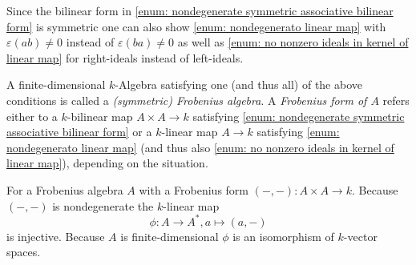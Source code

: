 \begin{rem}
  Since the bilinear form in \ref{enum: nondegenerate symmetric associative bilinear form} is symmetric one can also show \ref{enum: nondegenerato linear map} with $\varepsilon(ab) \neq 0$ instead of $\varepsilon(ba) \neq 0$ as well as \ref{enum: no nonzero ideals in kernel of linear map} for right-ideals instead of left-ideals.
\end{rem}


\begin{defi}
  A finite-dimensional $k$-Algebra satisfying one (and thus all) of the above conditions is called a \emph{(symmetric) Frobenius algebra}. A \emph{Frobenius form of $A$} refers either to a $k$-bilinear map $A \times A \to k$ satisfying \ref{enum: nondegenerate symmetric associative bilinear form} or a $k$-linear map $A \to k$ satisfying \ref{enum: nondegenerato linear map} (and thus also \ref{enum: no nonzero ideals in kernel of linear map}), depending on the situation.
\end{defi}


\begin{rem}
  For a Frobenius algebra $A$ with a Frobenius form $(-,-) \colon A \times A \to k$. Because $(-,-)$ is nondegenerate the $k$-linear map
  \[
    \phi \colon A \to A^*, a \mapsto (a,-)
  \]
  is injective. Because $A$ is finite-dimensional $\phi$ is an isomorphism of $k$-vector spaces.
\end{rem}


